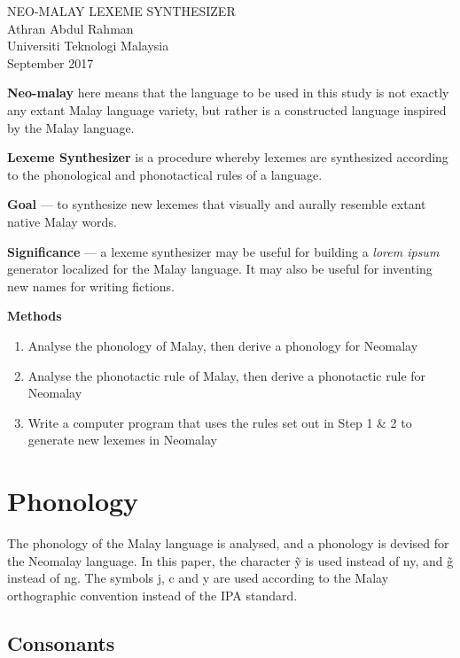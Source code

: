 \documentclass{article}
\newcommand{\grapheme}[1]{\textlangle#1\textrangle}
\begin{document}
\begin{center} {\LARGE NEO-MALAY LEXEME SYNTHESIZER}\\ \bigskip 
Athran Abdul Rahman\\
Universiti Teknologi Malaysia\\
September 2017\end{center}

\textbf{Neo-malay} here means that the language to be used in this study is not exactly any extant Malay language variety, but rather is a constructed language inspired by the Malay language.

\textbf{Lexeme Synthesizer} is a procedure whereby lexemes are synthesized according to the phonological and phonotactical rules of a language.

\textbf{Goal} --- to synthesize new lexemes that visually and aurally resemble extant native Malay words.

\textbf{Significance} --- a lexeme synthesizer may be useful for building a \textit{lorem ipsum} generator localized for the Malay language. It may also be useful for inventing new names for writing fictions.

\textbf{Methods}
\begin{enumerate}
	\item Analyse the phonology of Malay, then derive a phonology for Neomalay
	\item Analyse the phonotactic rule of Malay, then derive a phonotactic rule for Neomalay
	\item Write a computer program that uses the rules set out in Step 1 \& 2 to generate new lexemes in Neomalay
\end{enumerate}

\section{Phonology}

The phonology of the Malay language is analysed, and a phonology is devised for the Neomalay language. In this paper, the character \grapheme{\~y} is used instead of \grapheme{ny}, and \grapheme{\~g} instead of \grapheme{ng}. The symbols \grapheme{j}, \grapheme{c} and \grapheme{y} are used according to the Malay orthographic convention instead of the IPA standard.

\subsection{Consonants}
\end{document}
